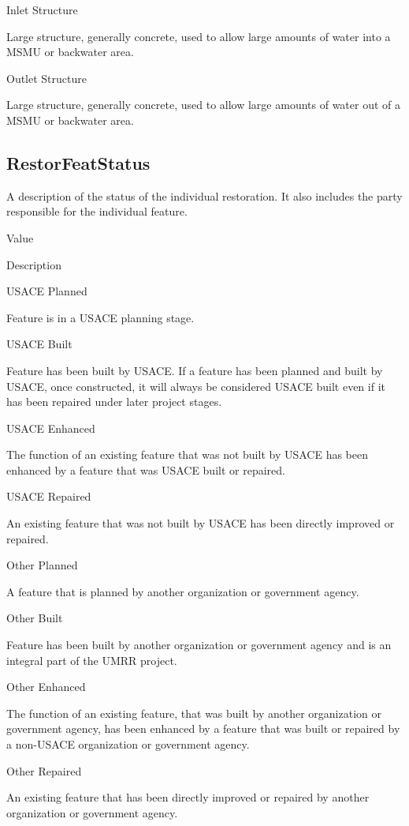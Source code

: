 \documentclass[
  letterpaper,
  DIV=11,
  numbers=noendperiod]{scrreprt}
\begin{document}
Inlet Structure

Large structure, generally concrete, used to allow large amounts of
water into a MSMU or backwater area.

Outlet Structure

Large structure, generally concrete, used to allow large amounts of
water out of a MSMU or backwater area.

\subsection{RestorFeatStatus}\label{restorfeatstatus-14}

A description of the status of the individual restoration. It also
includes the party responsible for the individual feature.

Value

Description

USACE Planned

Feature is in a USACE planning stage.

USACE Built

Feature has been built by USACE. If a feature has been planned and built
by USACE, once constructed, it will always be considered USACE built
even if it has been repaired under later project stages.

USACE Enhanced

The function of an existing feature that was not built by USACE has been
enhanced by a feature that was USACE built or repaired.

USACE Repaired

An existing feature that was not built by USACE has been directly
improved or repaired.

Other Planned

A feature that is planned by another organization or government agency.

Other Built

Feature has been built by another organization or government agency and
is an integral part of the UMRR project.

Other Enhanced

The function of an existing feature, that was built by another
organization or government agency, has been enhanced by a feature that
was built or repaired by a non-USACE organization or government agency.

Other Repaired

An existing feature that has been directly improved or repaired by
another organization or government agency.
\end{document}
